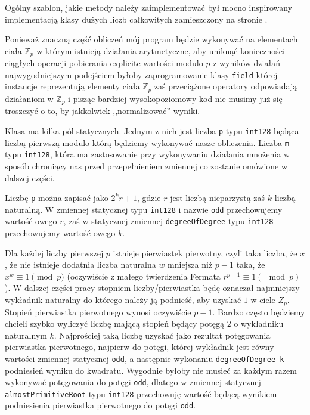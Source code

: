 \documentclass{article}
\begin{document}
Ogólny szablon, jakie metody należy zaimplementować był 
mocno inspirowany implementacją klasy dużych liczb całkowitych
zamieszczony na stronie .


Ponieważ znaczną część obliczeń mój program będzie wykonywać na elementach ciała
$\mathbb{Z}_p$ w którym istnieją działania arytmetyczne, aby uniknąć konieczności ciągłych operacji pobierania explicite
wartości modulo $p$ z wyników działań najwygodniejszym podejściem byłoby zaprogramowanie klasy \texttt{field} której instancje
reprezentują elementy ciała $\mathbb{Z}_p$ zaś przeciążone operatory odpowiadają działaniom w $\mathbb{Z}_p$ i pisząc bardziej 
wysokopoziomowy kod nie musimy już się troszczyć o to, by jakkolwiek ,,normalizować'' wyniki. 


Klasa ma kilka pól statycznych. Jednym z nich jest liczba \texttt{p} typu \texttt{\textunderscore \textunderscore int128}
będąca liczbą pierwszą modulo którą będziemy wykonywać nasze obliczenia. Liczba \texttt{m} typu 
\texttt{\textunderscore \textunderscore int128}, która ma zastosowanie przy wykonywaniu działania mnożenia w sposób
chroniący nas przed przepełnieniem zmiennej co zostanie omówione w dalszej części. 

Liczbę \texttt{p} można zapisać jako $2^kr+1$, gdzie $r$ jest liczbą nieparzystą zaś $k$ liczbą naturalną.
W zmiennej statycznej typu \texttt{\textunderscore \textunderscore int128} i nazwie \texttt{odd} przechowujemy
wartość owego $r$, zaś w statycznej zmiennej \texttt{degreeOfDegree} typu
\texttt{\textunderscore \textunderscore int128} przechowujemy wartość owego $k$.

Dla każdej liczby pierwszej $p$ istnieje pierwiastek pierwotny, czyli taka liczba, że $x$, że nie istnieje 
dodatnia liczba naturalna $w$ mniejsza niż $p-1$ taka, że $x^w \equiv 1 \pmod p$ (oczywiście z małego twierdzenia
Fermata $r^{p-1} \equiv 1 (\mod p)$). W dalszej części pracy stopniem liczby/pierwiastka będę oznaczał najmniejszy wykładnik
naturalny do którego należy ją podnieść, aby uzyskać $1$ w ciele $Z_p$. Stopień pierwiastka pierwotnego wynosi 
oczywiście $p-1$. Bardzo często będziemy chcieli szybko wyliczyć liczbę mającą stopień będący potęgą $2$ o 
wykładniku naturalnym $k$. Najprościej taką liczbę uzyskać jako rezultat potęgowania pierwiastka pierwotnego,
najpierw do potęgi, której wykładnik jest równy wartości zmiennej statycznej \texttt{odd}, a następnie
wykonaniu \texttt{degreeOfDegree-k}  podniesień wyniku do kwadratu. Wygodnie byłoby nie musieć za każdym razem
wykonywać potęgowania do potęgi \texttt{odd}, dlatego w zmiennej statycznej \texttt{almostPrimitiveRoot}
typu \texttt{\textunderscore \textunderscore int128} przechowuję wartość będącą wynikiem podniesienia pierwiastka
pierwotnego do potęgi \texttt{odd}.
\end{document}
